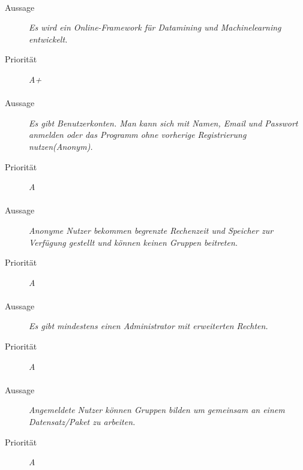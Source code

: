 \paragraph{}
\begin{description}
\item [Aussage] \textit{Es wird ein Online-Framework für Datamining und Machinelearning entwickelt.}
\item [Priorität] \textit{A+}
\end{description}

\paragraph{}
\begin{description}
\item [Aussage] \textit{Es gibt Benutzerkonten. Man kann sich mit Namen, Email und Passwort anmelden oder das Programm ohne vorherige Registrierung nutzen(Anonym).}
\item [Priorität] \textit{A}
\end{description}



\paragraph{}
\begin{description}
\item[Aussage] \textit{Anonyme Nutzer bekommen begrenzte Rechenzeit und Speicher zur Verfügung gestellt und können keinen Gruppen beitreten.}
\item[Priorität] \textit{A}
\end{description}

\paragraph{}
\begin{description}
\item[Aussage] \textit{Es gibt mindestens einen Administrator mit erweiterten Rechten.}
\item[Priorität] \textit{A}
\end{description}

\paragraph{}
\begin{description}
\item[Aussage] \textit{Angemeldete Nutzer können Gruppen bilden um gemeinsam an einem Datensatz/Paket zu arbeiten.}
\item[Priorität] \textit{A}
\end{description}

